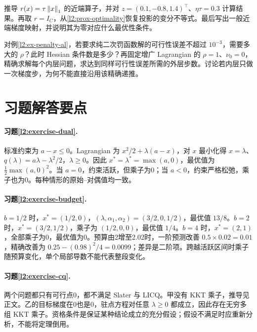 \begin{exercise}[从次梯度推出近端更新]
\label{l2:exercise-prox}
推导 $r(x)=\tau\left\lVert x\right\rVert_1$ 的近端算子，并对 $z=(0.1,-0.8,1.4)^\top$、$\eta\tau=0.3$ 计算结果。再取 $r=I_C$，从\eqref{l2:prox-optimality}恢复投影的变分不等式。最后写出一般近端梯度映射，并说明其为零对应什么最优性条件。
\end{exercise}

\begin{exercise}
\label{l2:exercise-al}
对例\ref{l2:ex-penalty-al}，若要求纯二次罚函数解的可行性误差不超过 $10^{-3}$，需要多大的 $\rho$？此时 Hessian 条件数是多少？再固定增广 Lagrangian 的 $\rho=1$、$\nu_0=0$，精确求解每个内层问题，求达到同样可行性误差所需的外层步数。讨论若内层只做一次梯度步，为何不能直接沿用该精确递推。
\end{exercise}

\section{习题解答要点}
\label{l2:solutions}

\paragraph{习题\ref{l2:exercise-dual}.}
标准约束为 $a-x\leq0$。Lagrangian 为 $x^2/2+\lambda(a-x)$，对 $x$ 最小化得 $x=\lambda$、$q(\lambda)=a\lambda-\lambda^2/2$，$\lambda\geq0$。因此 $x^*=\lambda^*=\max(a,0)$，最优值为 $\tfrac12\max(a,0)^2$。当 $a=0$，约束活跃，但乘子为0；当 $a<0$，约束严格松弛，乘子也为0。每种情形的原始--对偶值均一致。

\paragraph{习题\ref{l2:exercise-budget}.}
$b=1/2$ 时，$x^*=(1/2,0)$，$(\lambda,\alpha_1,\alpha_2)=(3/2,0,1/2)$，最优值 $13/8$。$b=2$ 时，$x^*=(3/2,1/2)$，乘子为 $(1/2,0,0)$，最优值 $1/4$。$b=4$ 时，$x^*=(2,1)$，全部乘子为0，最优值为0。预算由2增至2.02时，一阶预测改善 $0.5\times0.02=0.01$，精确改善为 $0.25-(0.98)^2/4=0.0099$；差异是二阶项。跨越活跃区间时乘子随预算变化，单个局部导数不能代表整段变化。

\paragraph{习题\ref{l2:exercise-cq}.}
两个问题都只有可行点0，都不满足 Slater 与 LICQ。甲没有 KKT 乘子，推导见正文。乙的目标梯度在0也是0，驻点方程对任意 $\lambda\geq0$ 都成立，因此存在无穷多组 KKT 乘子。资格条件是保证某种结论成立的充分假设；假设不满足时应重新分析，不能将定理倒用。

